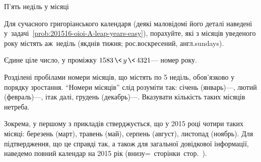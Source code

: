 \begin{problemAllDefault}{П'ять неділь у місяці}

Для сучасного григоріанського календаря (деякі маловідомі його деталі наведені у~задачі~\ref{prob:201516-oioi-A-leap-years-easy}), порахуйте, які з місяців уведеного року містять аж~неділь (як\nolinebreak[3] днів тижня; рос.\nolinebreak[3] воскресений, англ.\nolinebreak[3] sundays).

\InputFile 
Єдине ціле число, у проміжку ${1583\,{\<}\,y\,{\<}\,4321}$\nolinebreak[3] --- номер року.

\OutputFile	
Розділені пробілами номери місяців, що містять по 5 неділь, обов’язково у порядку зростання. ``Номери місяців'' слід розуміти так: 
січень (январь)\nolinebreak[3] ---, 
лютий (февраль)\nolinebreak[3] ---,
і\nolinebreak[3] так далі, 
грудень (декабрь)\nolinebreak[3] ---.
Вказувати кількість таких місяців не\nolinebreak[3] треба.

\Examples\hspace*{-0.5em}
\begin{exampleSimple}{3em}{5em}%
%
%
\end{exampleSimple}
\begin{exampleSimple}{3em}{5.5em}%
%
%
\end{exampleSimple}

\Notes
Зокрема, у першому з прикладів стверджується, що у 2015 році чотири таких місяці: березень (март), травень (май), серпень (август), листопад (ноябрь).
%
Для підтвердження, що це справді так, а також для загальної довідкової інформації, наведемо повний календар 
на 2015 рік (внизу\label{text:link-to-calendar-2015}\ifnum{}=~сторінки\else~стор.~\pageref{text:calendar-2015}\fi).

\begin{figure*}[!b]

\vspace*{-0.75\baselineskip}
\vspace{0pt plus 5pt}


\end{figure*}
\end{problemAllDefault}
